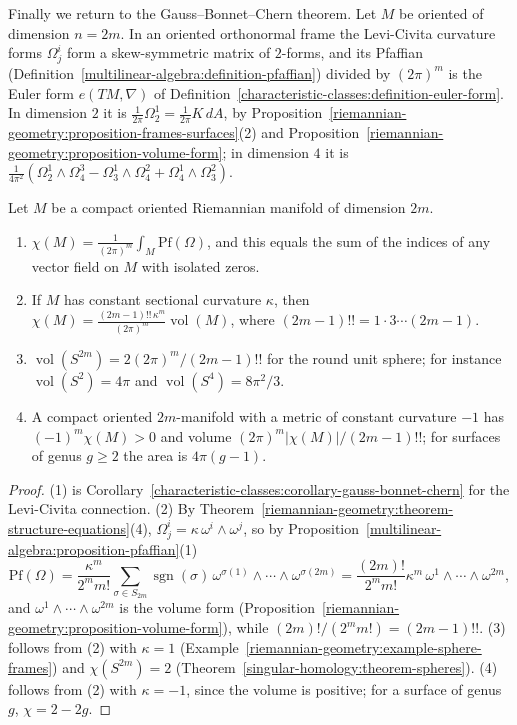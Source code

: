 Finally we return to the Gauss--Bonnet--Chern theorem. Let $M$ be oriented of dimension $n = 2m$. In an oriented orthonormal frame the Levi-Civita curvature forms $\Omega^i_j$ form a skew-symmetric
matrix of $2$-forms, and its Pfaffian (Definition~\ref{multilinear-algebra:definition-pfaffian}) divided by $(2\pi)^m$ is the Euler form $e(TM, \nabla)$ of
Definition~\ref{characteristic-classes:definition-euler-form}. In dimension $2$ it is $\frac{1}{2\pi}\Omega^1_2 = \frac{1}{2\pi}K\,dA$, by Proposition~\ref{riemannian-geometry:proposition-frames-surfaces}(2)
and Proposition~\ref{riemannian-geometry:proposition-volume-form}; in dimension $4$ it is $\frac{1}{4\pi^2}(\Omega^1_2 \wedge \Omega^3_4 - \Omega^1_3 \wedge \Omega^2_4 + \Omega^1_4 \wedge \Omega^2_3)$.

\begin{corollary}\label{riemannian-geometry:corollary-gauss-bonnet-chern}
Let $M$ be a compact oriented Riemannian manifold of dimension $2m$.
\begin{enumerate}
\item $\displaystyle\chi(M) = \frac{1}{(2\pi)^m}\int_M\mathrm{Pf}(\Omega)$, and this equals the sum of the indices of any vector field on $M$ with isolated zeros.
\item If $M$ has constant sectional curvature $\kappa$, then $\displaystyle\chi(M) = \frac{(2m-1)!!\,\kappa^m}{(2\pi)^m}\operatorname{vol}(M)$, where $(2m-1)!! = 1 \cdot 3 \cdots (2m-1)$.
\item $\operatorname{vol}(S^{2m}) = 2(2\pi)^m/(2m-1)!!$ for the round unit sphere; for instance $\operatorname{vol}(S^2) = 4\pi$ and $\operatorname{vol}(S^4) = 8\pi^2/3$.
\item A compact oriented $2m$-manifold with a metric of constant curvature $-1$ has $(-1)^m\chi(M) > 0$ and volume $(2\pi)^m|\chi(M)|/(2m-1)!!$; for surfaces of genus $g \geq 2$ the area
is $4\pi(g - 1)$.
\end{enumerate}
\end{corollary}

\begin{proof}
(1) is Corollary~\ref{characteristic-classes:corollary-gauss-bonnet-chern} for the Levi-Civita connection. (2) By Theorem~\ref{riemannian-geometry:theorem-structure-equations}(4),
$\Omega^i_j = \kappa\,\omega^i \wedge \omega^j$, so by Proposition~\ref{multilinear-algebra:proposition-pfaffian}(1)
\[
\mathrm{Pf}(\Omega) = \frac{\kappa^m}{2^mm!}\sum_{\sigma \in S_{2m}}\operatorname{sgn}(\sigma)\,\omega^{\sigma(1)} \wedge \cdots \wedge \omega^{\sigma(2m)} = \frac{(2m)!}{2^mm!}\kappa^m\,\omega^1 \wedge \cdots \wedge \omega^{2m},
\]
and $\omega^1 \wedge \cdots \wedge \omega^{2m}$ is the volume form (Proposition~\ref{riemannian-geometry:proposition-volume-form}), while $(2m)!/(2^mm!) = (2m-1)!!$. (3) follows from (2) with
$\kappa = 1$ (Example~\ref{riemannian-geometry:example-sphere-frames}) and $\chi(S^{2m}) = 2$ (Theorem~\ref{singular-homology:theorem-spheres}). (4) follows from (2) with $\kappa = -1$, since the
volume is positive; for a surface of genus $g$, $\chi = 2 - 2g$.
\end{proof}

